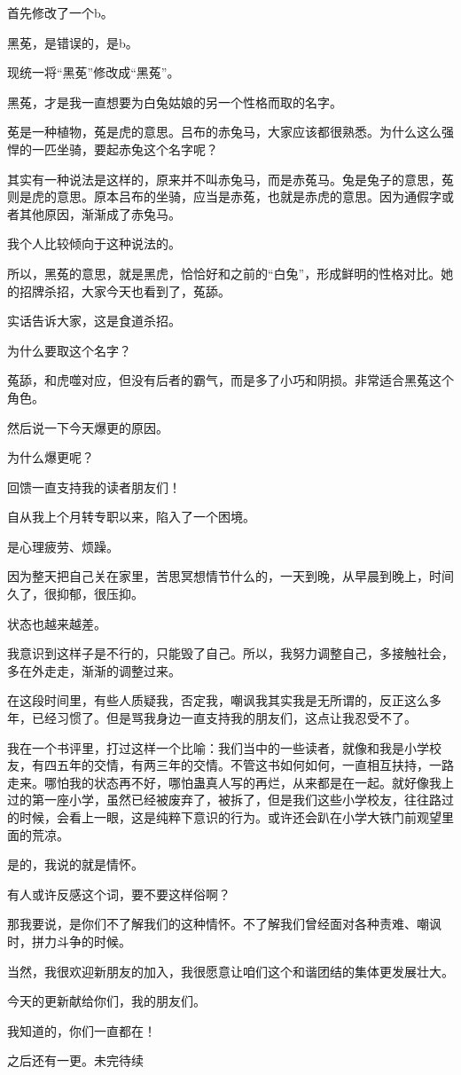 \begin{this_body}
首先修改了一个b。

黑莬，是错误的，是b。

现统一将“黑莬”修改成“黑菟”。

黑菟，才是我一直想要为白兔姑娘的另一个性格而取的名字。

莬是一种植物，菟是虎的意思。吕布的赤兔马，大家应该都很熟悉。为什么这么强悍的一匹坐骑，要起赤兔这个名字呢？

其实有一种说法是这样的，原来并不叫赤兔马，而是赤菟马。兔是兔子的意思，菟则是虎的意思。原本吕布的坐骑，应当是赤菟，也就是赤虎的意思。因为通假字或者其他原因，渐渐成了赤兔马。

我个人比较倾向于这种说法的。

所以，黑菟的意思，就是黑虎，恰恰好和之前的“白兔”，形成鲜明的性格对比。她的招牌杀招，大家今天也看到了，菟舔。

实话告诉大家，这是食道杀招。

为什么要取这个名字？

菟舔，和虎噬对应，但没有后者的霸气，而是多了小巧和阴损。非常适合黑菟这个角色。

然后说一下今天爆更的原因。

为什么爆更呢？

回馈一直支持我的读者朋友们！

自从我上个月转专职以来，陷入了一个困境。

是心理疲劳、烦躁。

因为整天把自己关在家里，苦思冥想情节什么的，一天到晚，从早晨到晚上，时间久了，很抑郁，很压抑。

状态也越来越差。

我意识到这样子是不行的，只能毁了自己。所以，我努力调整自己，多接触社会，多在外走走，渐渐的调整过来。

在这段时间里，有些人质疑我，否定我，嘲讽我其实我是无所谓的，反正这么多年，已经习惯了。但是骂我身边一直支持我的朋友们，这点让我忍受不了。

我在一个书评里，打过这样一个比喻：我们当中的一些读者，就像和我是小学校友，有四五年的交情，有两三年的交情。不管这书如何如何，一直相互扶持，一路走来。哪怕我的状态再不好，哪怕蛊真人写的再烂，从来都是在一起。就好像我上过的第一座小学，虽然已经被废弃了，被拆了，但是我们这些小学校友，往往路过的时候，会看上一眼，这是纯粹下意识的行为。或许还会趴在小学大铁门前观望里面的荒凉。

是的，我说的就是情怀。

有人或许反感这个词，要不要这样俗啊？

那我要说，是你们不了解我们的这种情怀。不了解我们曾经面对各种责难、嘲讽时，拼力斗争的时候。

当然，我很欢迎新朋友的加入，我很愿意让咱们这个和谐团结的集体更发展壮大。

今天的更新献给你们，我的朋友们。

我知道的，你们一直都在！

之后还有一更。未完待续

\end{this_body}

